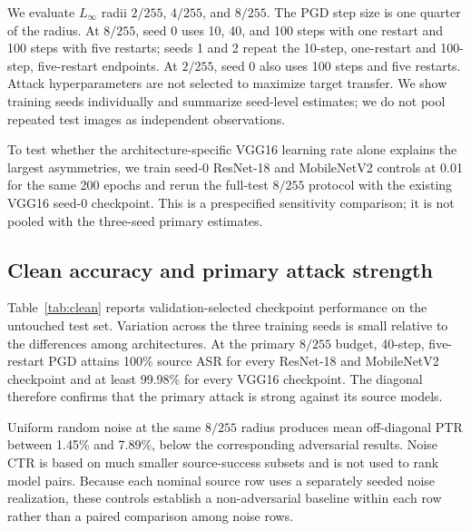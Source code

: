 \documentclass[10pt]{article}
\begin{document}
We evaluate $L_\infty$ radii $2/255$, $4/255$, and $8/255$. The PGD step size is one quarter of the radius. At $8/255$, seed 0 uses 10, 40, and 100 steps with one restart and 100 steps with five restarts; seeds 1 and 2 repeat the 10-step, one-restart and 100-step, five-restart endpoints. At $2/255$, seed 0 also uses 100 steps and five restarts. Attack hyperparameters are not selected to maximize target transfer. We show training seeds individually and summarize seed-level estimates; we do not pool repeated test images as independent observations.

To test whether the architecture-specific VGG16 learning rate alone explains the largest asymmetries, we train seed-0 ResNet-18 and MobileNetV2 controls at 0.01 for the same 200 epochs and rerun the full-test $8/255$ protocol with the existing VGG16 seed-0 checkpoint. This is a prespecified sensitivity comparison; it is not pooled with the three-seed primary estimates.

\subsection{Clean accuracy and primary attack strength}
Table~\ref{tab:clean} reports validation-selected checkpoint performance on the untouched test set. Variation across the three training seeds is small relative to the differences among architectures. At the primary $8/255$ budget, 40-step, five-restart PGD attains 100\% source ASR for every ResNet-18 and MobileNetV2 checkpoint and at least 99.98\% for every VGG16 checkpoint. The diagonal therefore confirms that the primary attack is strong against its source models.

Uniform random noise at the same $8/255$ radius produces mean off-diagonal PTR between 1.45\% and 7.89\%, below the corresponding adversarial results. Noise CTR is based on much smaller source-success subsets and is not used to rank model pairs. Because each nominal source row uses a separately seeded noise realization, these controls establish a non-adversarial baseline within each row rather than a paired comparison among noise rows.

\begin{table}[t]
\centering
\caption{Clean test accuracy (\%) by training seed. The final column is the mean and sample standard deviation over three checkpoints.}
\label{tab:clean}
\end{table}
\end{document}
